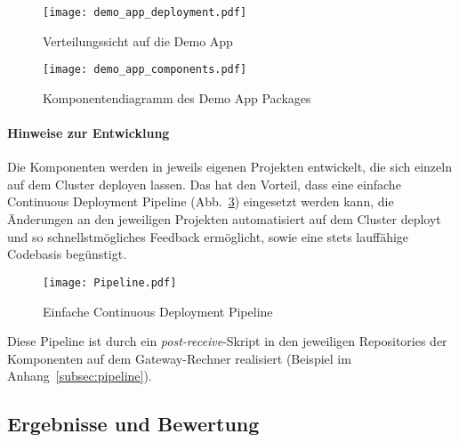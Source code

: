 \begin{figure}[ht!]
	\centering
  \texttt{[image: demo\_app\_deployment.pdf]}
	\caption{Verteilungssicht auf die Demo App}
	\label{figure:demo_app_verteilung}
\end{figure}


\begin{figure}[ht!]
	\centering
  \texttt{[image: demo\_app\_components.pdf]}
	\caption{Komponentendiagramm des Demo App Packages}
	\label{figure:demo_app_komponenten}
\end{figure}

\paragraph{Hinweise zur Entwicklung}
Die Komponenten werden in jeweils eigenen Projekten entwickelt, die sich einzeln auf dem Cluster deployen lassen. Das hat den Vorteil, dass eine einfache Continuous Deployment Pipeline (Abb.~\ref{figure:cd_pipeline}) eingesetzt werden kann, die Änderungen an den jeweiligen Projekten automatisiert auf dem Cluster deployt und so schnellstmögliches Feedback ermöglicht, sowie eine stets lauffähige Codebasis begünstigt.\\

\begin{figure}[ht!]
	\centering
  \texttt{[image: Pipeline.pdf]}
	\caption{Einfache Continuous Deployment Pipeline}
	\label{figure:cd_pipeline}
\end{figure}

Diese Pipeline ist durch ein \textit{post-receive}-Skript in den jeweiligen Repositories der Komponenten auf dem Gateway-Rechner realisiert (Beispiel im Anhang~\ref{subsec:pipeline}).\\

\subsection{Ergebnisse und Bewertung}

